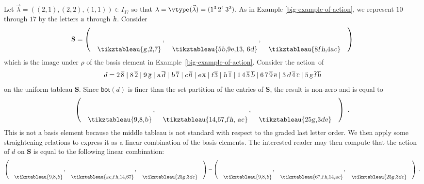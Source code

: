 \begin{example}
\label{big-example-of-action2}
\def\aa{{\textsl a}}
\def\bb{{\textsl b}}
\def\cc{{\textsl c}}
\def\dd{{\textsl d}}
\def\ee{{\textsl e}}
\def\ff{{\textsl f}}
\def\gg{{\textsl g}}
\def\hh{{\textsl h}}
Let $\vec{\lambda} = ((2,1), (2,2), (1,1)) \in I_{17}$ so that $\lambda = \vtype(\vec{\lambda}) = (1^3 \, 2^4 \, 3^2)$.
As in Example \ref{big-example-of-action}, we represent $10$ through $17$ by the letters $\aa$ through $\hh$.
Consider
\[
\mathbf{S} = \left( \quad\raisebox{-.2in}{\tikztableau{{\gg},{2,7}}}\,, \quad
\raisebox{-.2in}{\tikztableau{{5\bb,9\ee},{13, 6\dd}}}\,, \quad
\raisebox{-.2in}{\tikztableau{{8\ff\hh},{4\aa\cc}}}\quad\right)
\]
which is the image under $\rho$ of the basis element in Example~\ref{big-example-of-action}.
Consider the action~of 
\begin{equation*}
        d=    2\,\overline{8} \mid
            8\,\overline{2} \mid 9\,\overline{\gg} \mid \aa\,\overline{\dd} \mid \bb\,\overline{7} \mid \cc\,\overline{6} \mid \ee\,\overline{\aa} \mid
            \ff\,\overline{3} \mid \hh\,\overline{1} \mid
            1\,4\,\overline{5}\, \overline{\bb} \mid 6\,7\,\overline{9}\,\overline{\ee} \mid 3\,\dd\,\overline{4}\, \overline{\cc} \mid 5\,\gg\,\overline{\ff}\,\overline{\hh}
\end{equation*}
on the uniform tableau $\mathbf{S}$.
Since $\mathsf{bot}(d)$ is finer than
the set partition of the entries of $\mathbf{S}$, the
result is non-zero and is equal to
\[
\left( \quad\raisebox{-.2in}{\tikztableau{{9},{8,\bb}}}\, , \quad
\raisebox{-.2in}{\tikztableau{{14,67},{\ff\hh, \aa\cc}}}\, , \quad
\raisebox{-.2in}{\tikztableau{{25\gg},{3\dd\ee}}}\quad\right)~.
\]
This is not a basis element because the middle tableau
is not standard with respect to the graded last letter order.
We then
apply some straightening relations to express it as
a linear combination of the basis elements.
The interested reader may then compute that the action of $d$ on $\mathbf{S}$
is equal to the following
linear combination:
\[
\left( \quad\raisebox{-.2in}{\tikztableau{{9},{8,\bb}}}\,, \quad
\raisebox{-.2in}{\tikztableau{{\aa\cc,\ff\hh},{14,67}}}\,, \quad
\raisebox{-.2in}{\tikztableau{{25\gg},{3\dd\ee}}}\quad\right)
-
\left( \quad\raisebox{-.2in}{\tikztableau{{9},{8,\bb}}}\,, \quad
\raisebox{-.2in}{\tikztableau{{67,\ff\hh},{14,\aa\cc}}}\,, \quad
\raisebox{-.2in}{\tikztableau{{25\gg},{3\dd\ee}}}\quad\right)~.
\]
\end{example}


